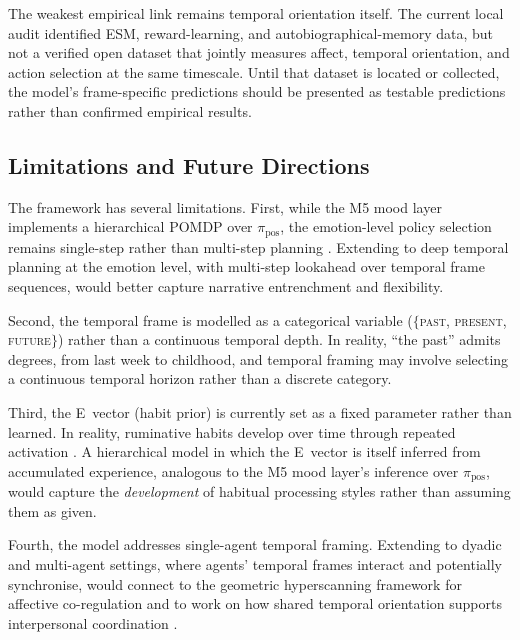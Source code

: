 \documentclass[11pt,a4paper]{article}
\begin{document}
The weakest empirical link remains temporal orientation itself. The current local audit identified ESM, reward-learning, and autobiographical-memory data, but not a verified open dataset that jointly measures affect, temporal orientation, and action selection at the same timescale. Until that dataset is located or collected, the model's frame-specific predictions should be presented as testable predictions rather than confirmed empirical results.

\subsection{Limitations and Future Directions}\label{sec:limitations}

The framework has several limitations. First, while the M5 mood layer implements a hierarchical POMDP over $\pi_{\text{pos}}$, the emotion-level policy selection remains single-step rather than multi-step planning \citep{friston2018deep}. Extending to deep temporal planning at the emotion level, with multi-step lookahead over temporal frame sequences, would better capture narrative entrenchment and flexibility.

Second, the temporal frame is modelled as a categorical variable ($\{$\textsc{past}, \textsc{present}, \textsc{future}$\}$) rather than a continuous temporal depth. In reality, ``the past'' admits degrees, from last week to childhood, and temporal framing may involve selecting a continuous temporal horizon rather than a discrete category.

Third, the E~vector (habit prior) is currently set as a fixed parameter rather than learned. In reality, ruminative habits develop over time through repeated activation \citep{watkins2008constructive}. A hierarchical model in which the E~vector is itself inferred from accumulated experience, analogous to the M5 mood layer's inference over $\pi_{\text{pos}}$, would capture the \emph{development} of habitual processing styles rather than assuming them as given.

Fourth, the model addresses single-agent temporal framing. Extending to dyadic and multi-agent settings, where agents' temporal frames interact and potentially synchronise, would connect to the geometric hyperscanning framework for affective co-regulation \citep{hinrichs2025temporal} and to work on how shared temporal orientation supports interpersonal coordination \citep{eldar2016mood}.



\end{document}
